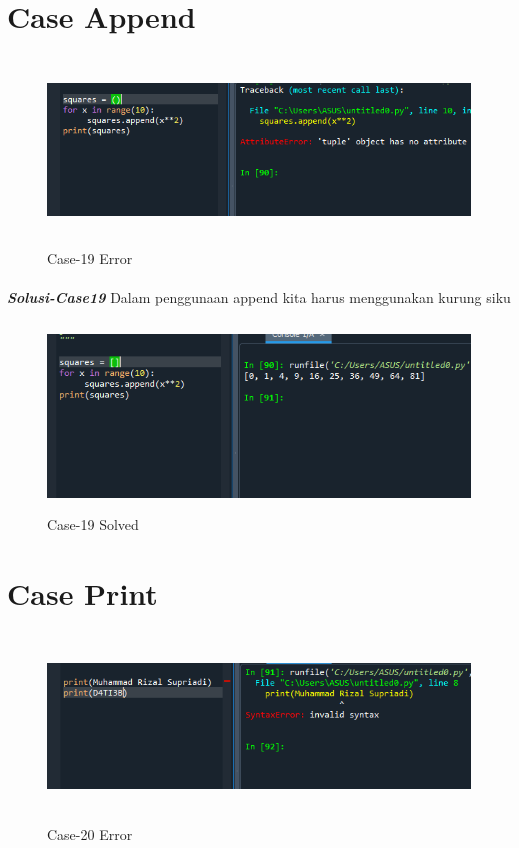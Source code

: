 \documentclass[12pt,a4paper]{article}
\begin{document}
\newpage
\section{Case Append}
\begin{figure}[ht]
    \centerline{\includegraphics[width=15cm,height=5cm]{image/case19.png}}
    \renewcommand{\figurename}{Gambar}
    \caption{Case-19 Error}
\end{figure}
\paragraph{}\textbf{\textit{Solusi-Case19}} {Dalam penggunaan append kita harus menggunakan kurung siku}
\begin{figure}[ht]
    \centerline{\includegraphics[width=15cm,height=5cm]{image/case19-solved.png}}
    \renewcommand{\figurename}{Gambar}
    \caption{Case-19 Solved}
\end{figure}

\newpage
\section{Case Print}
\begin{figure}[ht]
    \centerline{\includegraphics[width=15cm,height=5cm]{image/case20.png}}
    \renewcommand{\figurename}{Gambar}
    \caption{Case-20 Error}
\end{figure}
\end{document}
